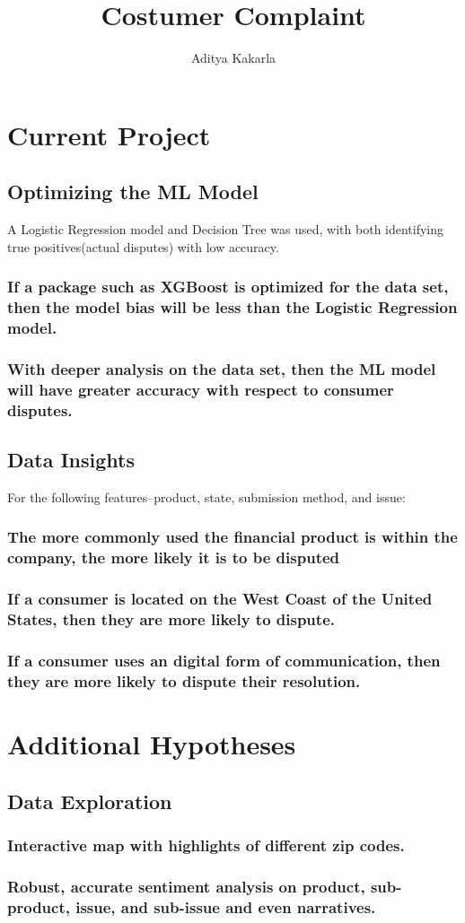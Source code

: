 \documentclass{report}
\title{Costumer Complaint}
\author{Aditya Kakarla}
\begin{document}
\maketitle

\chapter{Current Project}

\section{Optimizing the ML Model}
A Logistic Regression model and Decision Tree was used, with both identifying true positives(actual disputes) with low accuracy.
\subsection{If a package such as XGBoost is optimized for the data set, then the model bias will be less than the Logistic Regression model.}
\subsection{With deeper analysis on the data set, then the ML model will have greater accuracy with respect to consumer disputes.}

\section{Data Insights}
For the following features–product, state, submission method, and issue:
\subsection{The more commonly used the financial product is within the company, the more likely it is to be disputed}
\subsection{If a consumer is located on the West Coast of the United States, then they are more likely to dispute.}
\subsection{If a consumer uses an digital form of communication, then they are more likely to dispute their resolution.}


\chapter{Additional Hypotheses}

\section{Data Exploration}
\subsection{Interactive map with highlights of different zip codes.}
\subsection{Robust, accurate sentiment analysis on product, sub-product, issue, and sub-issue and even narratives.}
\end{document}

